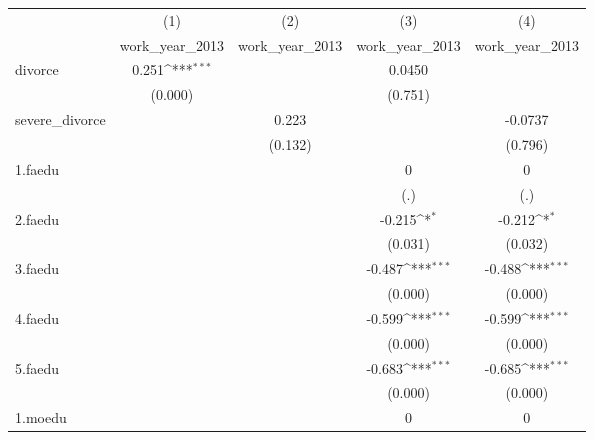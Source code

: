 {
\def\sym#1{\ifmmode^{#1}\else\(^{#1}\)\fi}
\begin{tabular}{l*{4}{c}}
\hline\hline
            &\multicolumn{1}{c}{(1)}&\multicolumn{1}{c}{(2)}&\multicolumn{1}{c}{(3)}&\multicolumn{1}{c}{(4)}\\
            &\multicolumn{1}{c}{work\_year\_2013}&\multicolumn{1}{c}{work\_year\_2013}&\multicolumn{1}{c}{work\_year\_2013}&\multicolumn{1}{c}{work\_year\_2013}\\
\hline
divorce     &       0.251\sym{***}&                     &      0.0450         &                     \\
            &     (0.000)         &                     &     (0.751)         &                     \\
[1em]
severe\_divorce&                     &       0.223         &                     &     -0.0737         \\
            &                     &     (0.132)         &                     &     (0.796)         \\
[1em]
1.faedu     &                     &                     &           0         &           0         \\
            &                     &                     &         (.)         &         (.)         \\
[1em]
2.faedu     &                     &                     &      -0.215\sym{*}  &      -0.212\sym{*}  \\
            &                     &                     &     (0.031)         &     (0.032)         \\
[1em]
3.faedu     &                     &                     &      -0.487\sym{***}&      -0.488\sym{***}\\
            &                     &                     &     (0.000)         &     (0.000)         \\
[1em]
4.faedu     &                     &                     &      -0.599\sym{***}&      -0.599\sym{***}\\
            &                     &                     &     (0.000)         &     (0.000)         \\
[1em]
5.faedu     &                     &                     &      -0.683\sym{***}&      -0.685\sym{***}\\
            &                     &                     &     (0.000)         &     (0.000)         \\
[1em]
1.moedu     &                     &                     &           0         &           0         \\

\end{tabular}}

